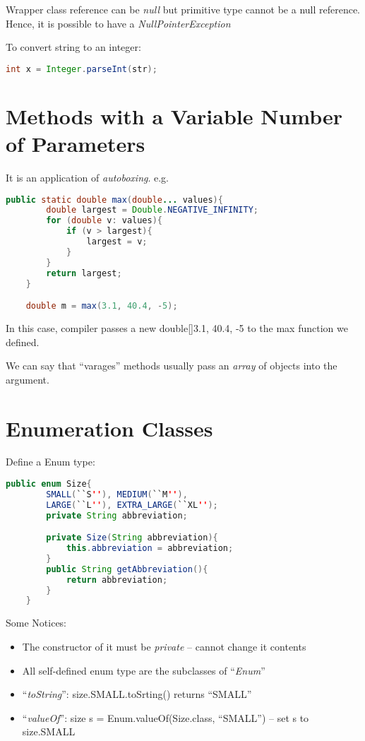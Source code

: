 \documentclass[12pt]{article}
\begin{document}
Wrapper class reference can be \emph{null} but primitive type cannot be a null reference. Hence,
it is possible to have a \emph{NullPointerException}

To convert string to an integer:
\begin{lstlisting}[language=Java]
    int x = Integer.parseInt(str);
\end{lstlisting}

\section{Methods with a Variable Number of Parameters}
It is an application of \emph{autoboxing}.\newline
e.g.
\begin{lstlisting}[language=Java]
    public static double max(double... values){
        double largest = Double.NEGATIVE_INFINITY;
        for (double v: values){
            if (v > largest){
                largest = v;
            }
        }
        return largest;
    }

    double m = max(3.1, 40.4, -5);
\end{lstlisting}
In this case, compiler passes a new double[]{3.1, 40.4, -5} to the max function we defined.

We can say that ``varages'' methods usually pass an \emph{array} of objects into the argument.

\section{Enumeration Classes}
Define a Enum type:
\begin{lstlisting}[language=Java]
    public enum Size{
        SMALL(``S''), MEDIUM(``M''), 
        LARGE(``L''), EXTRA_LARGE(``XL'');
        private String abbreviation;

        private Size(String abbreviation){
            this.abbreviation = abbreviation;
        }
        public String getAbbreviation(){
            return abbreviation;
        }
    }
\end{lstlisting}

Some Notices:
\begin{itemize}
    \item The constructor of it must be \emph{private} -- cannot change it contents
    \item All self-defined enum type are the subclasses of ``\emph{Enum}''
    \item ``\emph{toString}'': size.SMALL.toSrting() returns ``SMALL''
    \item ``\emph{valueOf}'': size s = Enum.valueOf(Size.class, ``SMALL'') -- set s to size.SMALL
\end{itemize}
\end{document}
